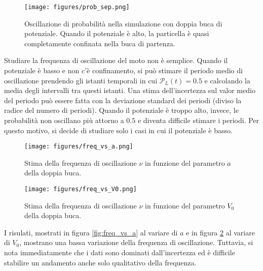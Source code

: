 \documentclass[a4paper, titlepage]{article}
\numberwithin{equation}{section}
\begin{document}
\begin{figure}[h!]
    \centering
    \begin{minipage}{0.47 \textwidth}
        \centering
        \texttt{[image: figures/prob\_sep.png]}
        \caption{Oscillazione di probabilità nella simulazione con doppia buca di potenziale. Quando il potenziale è alto, la particella è quasi completamente confinata nella buca di partenza.}
        \label{fig:prob_sep}
    \end{minipage}
    \hspace{0.02\textwidth}
    \begin{minipage}{0.47 \textwidth}
    \end{minipage}
\end{figure}
Studiare la frequenza di oscillazione del moto non è semplice. Quando il potenziale è basso e non c'è confinamento, si può stimare il periodo medio di oscillazione prendendo gli istanti temporali in cui $\mathcal{P}_L(t) = 0.5$ e calcolando la media degli intervalli tra questi istanti. Una stima dell'incertezza sul valor medio del periodo può essere fatta con la deviazione standard dei periodi (diviso la radice del numero di periodi). Quando il potenziale è troppo alto, invece, le probabilità non oscillano più attorno a $0.5$ e diventa difficile stimare i periodi. Per questo motivo, si decide di studiare solo i casi in cui il potenziale è basso.
\begin{figure}[h!]
    \centering
    \begin{minipage}[t]{0.47 \textwidth}
        \centering
        \texttt{[image: figures/freq\_vs\_a.png]}
        \caption{Stima della frequenza di oscillazione $\nu$ in funzione del parametro $a$ della doppia buca.}
        \label{fig:freq_vs_a}
    \end{minipage}
    \hspace{0.02\textwidth}
    \begin{minipage}[t]{0.47 \textwidth}
        \centering
        \texttt{[image: figures/freq\_vs\_V0.png]}
        \caption{Stima della frequenza di oscillazione $\nu$ in funzione del parametro $V_0$ della doppia buca.}
        \label{fig:freq_vs_V0}
    \end{minipage}
\end{figure}
I risulati, mostrati in figura \ref{fig:freq_vs_a} al variare di $a$ e in figura \ref{fig:freq_vs_V0} al variare di $V_0$, mostrano una bassa variazione della frequenza di oscillazione. Tuttavia, si nota immediatamente che i dati sono dominati dall'incertezza ed è difficile stabilire un andamento anche solo qualitativo della frequenza.
\end{document}
